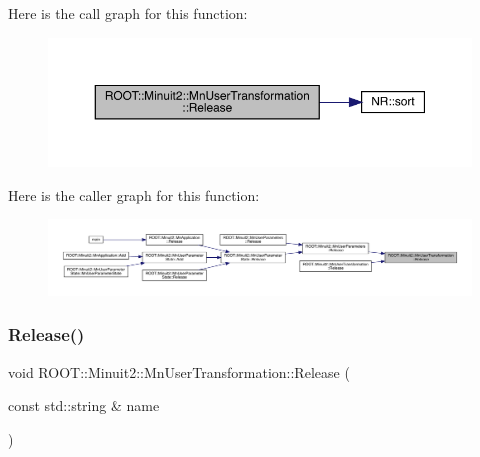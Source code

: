 Here is the call graph for this function\+:\nopagebreak
\begin{figure}[H]
\begin{center}
\leavevmode
\includegraphics[width=350pt]{d9/d98/classROOT_1_1Minuit2_1_1MnUserTransformation_acc0c7437f21dc53d1d56d62f7a82d352_cgraph}
\end{center}
\end{figure}
Here is the caller graph for this function\+:\nopagebreak
\begin{figure}[H]
\begin{center}
\leavevmode
\includegraphics[width=350pt]{d9/d98/classROOT_1_1Minuit2_1_1MnUserTransformation_acc0c7437f21dc53d1d56d62f7a82d352_icgraph}
\end{center}
\end{figure}
\mbox{\label{classROOT_1_1Minuit2_1_1MnUserTransformation_ac9272ca2d514e879f59b0bb7dcbf9906}} 
\subsubsection{\texorpdfstring{Release()}{Release()}\hspace{0.1cm}{\footnotesize\ttfamily [3/4]}}
{\footnotesize\ttfamily void R\+O\+O\+T\+::\+Minuit2\+::\+Mn\+User\+Transformation\+::\+Release (\begin{DoxyParamCaption}\item[{const std\+::string \&}]{name }\end{DoxyParamCaption})}


